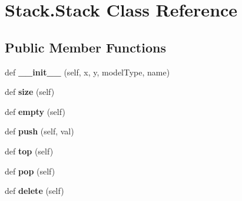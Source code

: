 \hypertarget{class_stack_1_1_stack}{}\section{Stack.\+Stack Class Reference}
\label{class_stack_1_1_stack}
\subsection*{Public Member Functions}
\begin{DoxyCompactItemize}
\item 
\mbox{\label{class_stack_1_1_stack_a7f70c39c7407c4939620daec869a821f}} 
def {\bfseries \+\_\+\+\_\+init\+\_\+\+\_\+} (self, x, y, model\+Type, name)
\item 
\mbox{\label{class_stack_1_1_stack_ad9471af89d6d83d7bc042b75bd6c1995}} 
def {\bfseries size} (self)
\item 
\mbox{\label{class_stack_1_1_stack_a9067f94dbf1a0d820abd4eb0339d6326}} 
def {\bfseries empty} (self)
\item 
\mbox{\label{class_stack_1_1_stack_a88abef205b55d9d26ef7958d61c4c313}} 
def {\bfseries push} (self, val)
\item 
\mbox{\label{class_stack_1_1_stack_a5f953865bd581272431c9a1664aa43ec}} 
def {\bfseries top} (self)
\item 
\mbox{\label{class_stack_1_1_stack_a3bc727e674359c79cfd00996895ffe4e}} 
def {\bfseries pop} (self)
\item 
\mbox{\label{class_stack_1_1_stack_a763aefe5c343111354717047aebd7967}} 
def {\bfseries delete} (self)
\end{DoxyCompactItemize}
